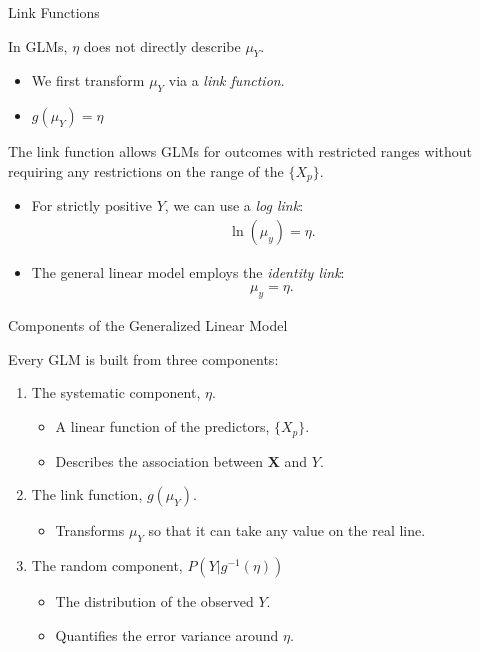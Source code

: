 \documentclass{beamer}\usepackage[]{graphicx}\usepackage[]{color}
\begin{document}
\begin{frame}{Link Functions}
  
  In GLMs, $\eta$ does not directly describe $\mu_Y$.
  \begin{itemize}
  \item We first transform $\mu_Y$ via a \emph{link function}.
  \item $g(\mu_Y) = \eta$
  \end{itemize}
  \vb
  The link function allows GLMs for outcomes with restricted ranges without 
  requiring any restrictions on the range of the $\{X_p\}$.
  \vc
  \begin{itemize}
  \item For strictly positive $Y$, we can use a \emph{log link}: 
    \begin{align*}
      \ln(\mu_y) = \eta.
    \end{align*}
  \item The general linear model employs the \emph{identity link}: 
    \begin{align*}
      \mu_y = \eta.
    \end{align*}
  \end{itemize}
  
\end{frame}


\begin{frame}{Components of the Generalized Linear Model}
  
  Every GLM is built from three components:
  \vb
  \begin{enumerate}
  \item The systematic component, $\eta$.
    \begin{itemize}
    \item A linear function of the predictors, $\{X_p\}$.
    \item Describes the association between $\mathbf{X}$ and $Y$.
    \end{itemize}
    \vb
  \item The link function, $g(\mu_Y)$.
    \begin{itemize}
    \item Transforms $\mu_Y$ so that it can take any value on the real line.
    \end{itemize}
    \vb
  \item The random component, $P(Y|g^{-1}(\eta))$
    \begin{itemize}
    \item The distribution of the observed $Y$.
    \item Quantifies the error variance around $\eta$.
    \end{itemize}
  \end{enumerate}
  
\end{frame}
\end{document}

